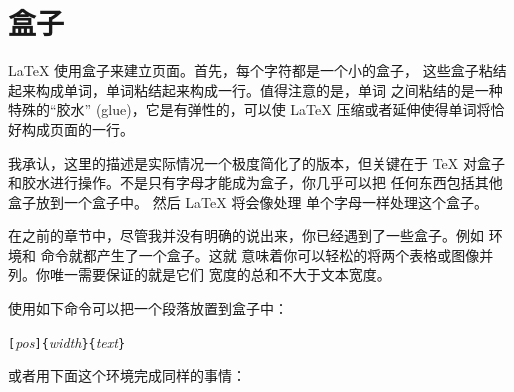 \section{盒子}
\LaTeX{} 使用盒子来建立页面。首先，每个字符都是一个小的盒子，
这些盒子粘结起来构成单词，单词粘结起来构成一行。值得注意的是，单词
之间粘结的是一种特殊的“胶水” (glue)，它是有弹性的，可以使 \LaTeX{} 压缩或者延伸使得单词将恰好构成页面的一行。

我承认，这里的描述是实际情况一个极度简化了的版本，但关键在于 \TeX{} 
对盒子和胶水进行操作。不是只有字母才能成为盒子，你几乎可以把
任何东西包括其他盒子放到一个盒子中。 然后 \LaTeX{} 将会像处理
单个字母一样处理这个盒子。

在之前的章节中，尽管我并没有明确的说出来，你已经遇到了一些盒子。例如
  环境和  命令就都产生了一个盒子。这就
意味着你可以轻松的将两个表格或图像并列。你唯一需要保证的就是它们
宽度的总和不大于文本宽度。

使用如下命令可以把一个段落放置到盒子中：
\begin{lscommand}
\verb|[|\emph{pos}\verb|]{|\emph{width}\verb|}{|\emph{text}\verb|}|
\end{lscommand}

\noindent 或者用下面这个环境完成同样的事情：

